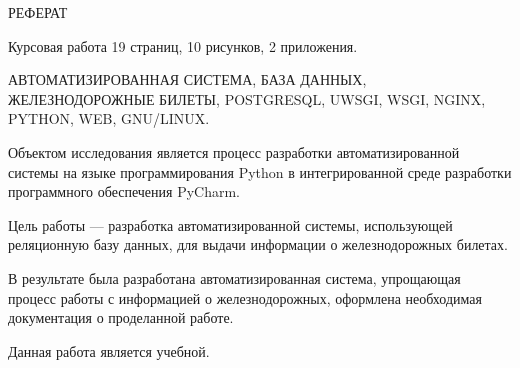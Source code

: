 \begin{center}
РЕФЕРАТ
\end{center}

Курсовая работа 19 страниц, 10 рисунков, 2 приложения.\par 

АВТОМАТИЗИРОВАННАЯ СИСТЕМА, БАЗА ДАННЫХ, ЖЕЛЕЗНОДОРОЖНЫЕ БИЛЕТЫ, POSTGRESQL, UWSGI, WSGI, NGINX, PYTHON, WEB, GNU/LINUX.\par

Объектом исследования является процесс разработки автоматизированной системы на языке программирования Python в интегрированной среде разработки программного обеспечения PyCharm.\par 
 
Цель работы --- разработка автоматизированной системы, использующей реляционную базу данных, для выдачи информации о железнодорожных билетах.\par 

В результате была разработана автоматизированная система, упрощающая процесс работы с информацией о железнодорожных, оформлена необходимая документация о проделанной работе.\par

Данная работа является учебной.\par

\clearpage